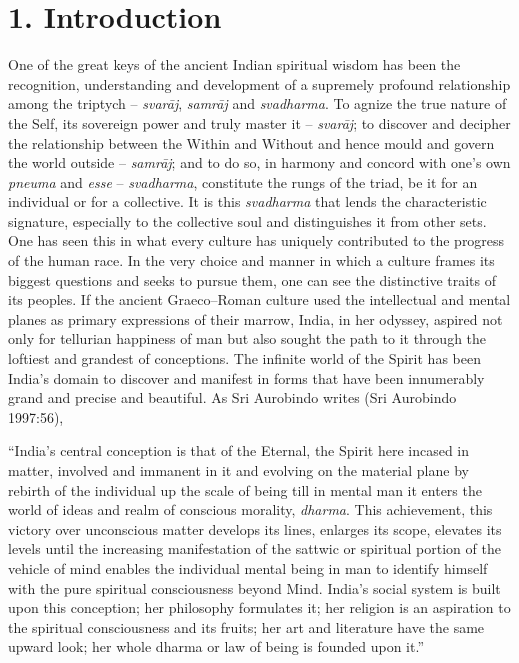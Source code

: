\section*{1. Introduction}

One of the great keys of the ancient Indian spiritual wisdom has been the recognition, understanding and development of a supremely profound relationship among the triptych – \textit{svarāj}, \textit{samrāj} and \textit{svadharma}. To agnize the true nature of the Self, its sovereign power and truly master it – \textit{svarāj}; to discover and decipher the relationship between the Within and Without and hence mould and govern the world outside – \textit{samrāj}; and to do so, in harmony and concord with one’s own \textit{pneuma} and \textit{esse} – \textit{svadharma}, constitute the rungs of the triad, be it for an individual or for a collective. It is this \textit{svadharma} that lends the characteristic signature, especially to the collective soul and distinguishes it from other sets. One has seen this in what every culture has uniquely contributed to the progress of the human race. In the very choice and manner in which a culture frames its biggest questions and seeks to pursue them, one can see the distinctive traits of its peoples. If the ancient Graeco–Roman culture used the intellectual and mental planes as primary expressions of their marrow, India, in her odyssey, aspired not only for tellurian happiness of man but also sought the path to it through the loftiest and grandest of conceptions. The infinite world of the Spirit has been India’s domain to discover and manifest in forms that have been innumerably grand and precise and beautiful. As Sri Aurobindo writes (Sri Aurobindo 1997:56),

\begin{myquote}
“India’s central conception is that of the Eternal, the Spirit here incased in matter, involved and immanent in it and evolving on the material plane by rebirth of the individual up the scale of being till in mental man it enters the world of ideas and realm of conscious morality, \textit{dharma}. This achievement, this victory over unconscious matter develops its lines, enlarges its scope, elevates its levels until the increasing manifestation of the sattwic or spiritual portion of the vehicle of mind enables the individual mental being in man to identify himself with the pure spiritual consciousness beyond Mind. India’s social system is built upon this conception; her philosophy formulates it; her religion is an aspiration to the spiritual consciousness and its fruits; her art and literature have the same upward look; her whole dharma or law of being is founded upon it.”
\end{myquote}

